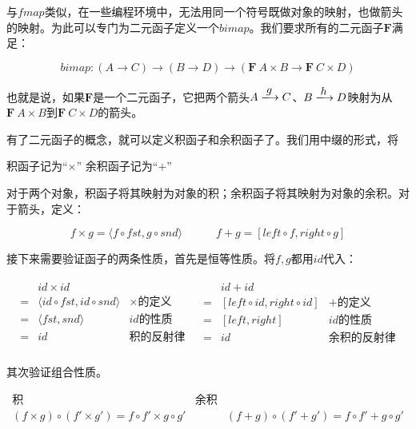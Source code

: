 \documentclass{article}
\begin{document}
与$fmap$类似，在一些编程环境中，无法用同一个符号既做对象的映射，也做箭头的映射。为此可以专门为二元函子定义一个$bimap$。我们要求所有的二元函子$\mathbf{F}$满足：

\[
bimap : (A \to C) \to (B \to D) \to (\mathbf{F}\ A \times B \to \mathbf{F}\ C \times D)
\]

也就是说，如果$\mathbf{F}$是一个二元函子，它把两个箭头$A \arrowto{g} C$、$B \arrowto{h} D$映射为从$\mathbf{F}\ A \times B$到$\mathbf{F}\ C \times D$的箭头。

有了二元函子的概念，就可以定义积函子和余积函子了。我们用中缀的形式，将

\begin{center}
积函子记为“$\times$” \quad \quad \quad 余积函子记为“$+$”
\end{center}

对于两个对象，积函子将其映射为对象的积；余积函子将其映射为对象的余积。对于箭头，定义：

\[
f \times g = \langle f \circ fst, g \circ snd \rangle
\quad \quad \quad
f + g = [left \circ f, right \circ g]
\]

接下来需要验证函子的两条性质，首先是恒等性质。将$f, g$都用$id$代入：

\[
\begin{array}{lr}
  \begin{array}{cll}
    & id \times id & \\
  = & \langle id \circ fst, id \circ snd \rangle & \text{$\times$的定义} \\
  = & \langle fst, snd \rangle & \text{$id$的性质} \\
  = & id & \text{积的反射律} \\
  \end{array}
  &
  \begin{array}{cll}
    & id + id & \\
  = & [ left \circ id, right \circ id ] & \text{$+$的定义} \\
  = & [ left, right] & \text{$id$的性质} \\
  = & id & \text{余积的反射律} \\
  \end{array}
\end{array}
\]

其次验证组合性质。

\[
\begin{array}{ccc}
\text{积} & \text{余积} \\
 (f \times g) \circ (f' \times g') = f \circ f' \times g \circ g'
 & \quad \quad &
 (f + g) \circ (f' + g') = f \circ f' + g \circ g'
\end{array}
\]
\end{document}
